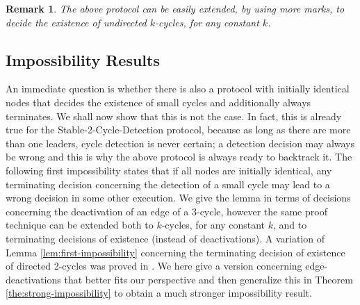 \documentclass[preprint]{elsarticle}
\newtheorem{remark}{Remark}
\begin{document}
\begin{remark}
The above protocol can be easily extended, by using more marks, to decide the existence of undirected $k$-cycles, for any constant $k$.
\end{remark}

\subsection{Impossibility Results}
\label{subsec:impossibilities}

An immediate question is whether there is also a protocol with initially identical nodes that decides the existence of small cycles and additionally always terminates. We shall now show that this is not the case. In fact, this is already true for the Stable-2-Cycle-Detection protocol, because as long as there are more than one leaders, cycle detection is never certain; a detection decision may always be wrong and this is why the above protocol is always ready to backtrack it. The following first impossibility states that if all nodes are initially identical, any terminating decision concerning the detection of a small cycle may lead to a wrong decision in some other execution. We give the lemma in terms of decisions concerning the deactivation of an edge of a 3-cycle, however the same proof technique can be extended both to $k$-cycles, for any constant $k$, and to terminating decisions of existence (instead of deactivations). A variation of Lemma \ref{lem:first-impossibility} concerning the terminating decision of existence of directed 2-cycles was proved in \cite{CMNS13}. We here give a version concerning edge-deactivations that better fits our perspective and then generalize this in Theorem \ref{the:strong-impossibility} to obtain a much stronger impossibility result.
\end{document}
